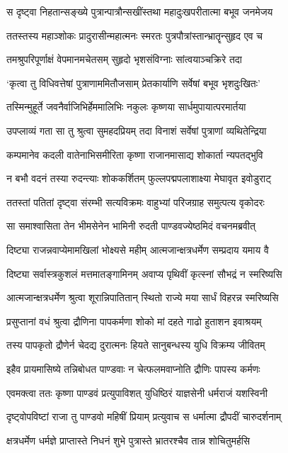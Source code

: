 \twolineshloka
{स दृष्ट्वा निहतान्सङ्ख्ये पुत्रान्पात्रौन्सखींस्तथा}
{महादुःखपरीतात्मा बभूव जनमेजय}


\twolineshloka
{ततस्तस्य महाञ्शोकः प्रादुरासीन्महात्मनः}
{स्मरतः पुत्रपौत्रांस्तान्भ्रातॄन्सुहृद एव च}


\twolineshloka
{तमश्रुपरिपूर्णाक्षं वेपमानमचेतसम्}
{सुहृदो भृशसंविग्नाः सांत्वयाञ्चक्रिरे तदा}


\twolineshloka
{`कृत्वा तु विधिवत्तेषां पुत्राणाममितौजसाम्}
{प्रेतकार्याणि सर्वेषां बभूव भृशदुःखितः'}


\twolineshloka
{तस्मिन्मुहूर्ते जवनैर्वाजिभिर्हेममालिभिः}
{नकुलः कृष्णया सार्धमुपायात्परमार्तया}


\twolineshloka
{उपप्लाव्यं गता सा तु श्रुत्वा सुमहदप्रियम्}
{तदा विनाशं सर्वेषां पुत्राणां व्यथितेन्द्रिया}


\twolineshloka
{कम्पमानेव कदली वातेनाभिसमीरिता}
{कृष्णा राजानमासाद्य शोकार्ता न्यपतद्भुवि}


\twolineshloka
{न बभौ वदनं तस्या रुदन्त्याः शोककर्शितम्}
{फुल्लपद्मपलाशाक्ष्या मेघावृत इवोडुराट्}


\twolineshloka
{ततस्तां पतितां दृष्ट्वा संरम्भी सत्यविक्रमः}
{वाहुभ्यां परिजग्राह समुत्पत्य वृकोदरः}


\twolineshloka
{सा समाश्वासिता तेन भीमसेनेन भामिनी}
{रुदती पाण्डवज्येष्ठमिदं वचनमब्रवीत्}


\twolineshloka
{दिष्ट्या राजन्नवाप्येमामखिलां भोक्ष्यसे महीम्}
{आत्मजान्क्षत्रधर्मेण सम्प्रदाय यमाय वै}


\twolineshloka
{दिष्ट्या सर्वास्त्रकुशलं मत्तमातङ्गामिनम्}
{अवाप्य पृथिवीं कृत्स्नां सौभद्रं न स्मरिष्यसि}


\twolineshloka
{आत्मजान्क्षत्रधर्मेण श्रुत्वा शूरान्निपातितान्}
{स्थितो राज्ये मया सार्धं विहरन्न स्मरिष्यसि}


\twolineshloka
{प्रसुप्तानां वधं श्रुत्वा द्रौणिना पापकर्मणा}
{शोको मां दहते गाढो हुताशन इवाश्रयम्}


\twolineshloka
{तस्य पापकृतो द्रौणेर्न चेदद्य दुरात्मनः}
{हियते सानुबन्धस्य युधि विक्रम्य जीवितम्}


\twolineshloka
{इहैव प्रायमासिष्ये तन्निबोधत पाण्डवाः}
{न चेत्फलमवाप्नोति द्रौणिः पापस्य कर्मणः}


\twolineshloka
{एवमक्त्वा ततः कृष्णा पाण्डवं प्रत्युपाविशत्}
{युधिष्ठिरं याज्ञसेनी धर्मराजं यशस्विनी}


\twolineshloka
{दृष्ट्वोपविष्टां राजा तु पाण्डवो महिषीं प्रियाम्}
{प्रत्युवाच स धर्मात्मा द्रौपदीं चारुदर्शनाम्}


\twolineshloka
{क्षत्रधर्मेण धर्मज्ञे प्राप्तास्ते निधनं शुभे}
{पुत्रास्ते भ्रातरश्चैव तान्न शोचितुमर्हसि}


